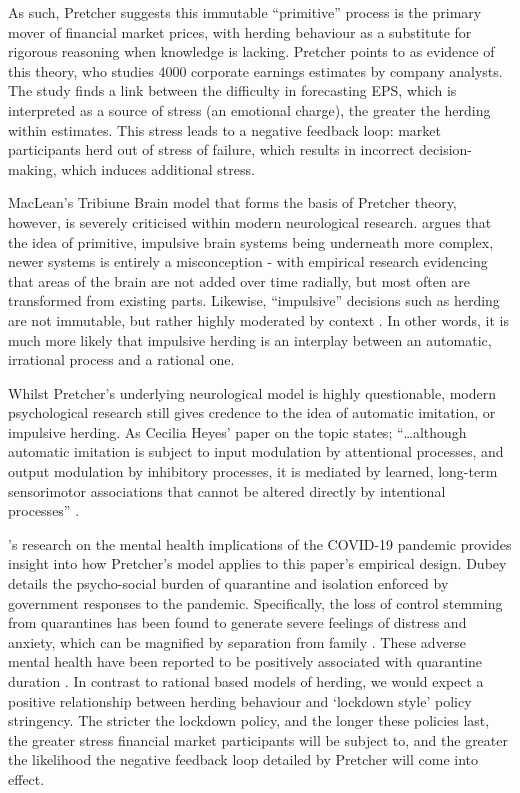 \documentclass[12pt]{article}
\numberwithin{table}{section}   %
\begin{document}
As such, Pretcher suggests this immutable “primitive” process is the primary mover of financial market prices, with herding behaviour as a substitute for rigorous reasoning when knowledge is lacking. Pretcher points to \citet{olsen} as evidence of this theory, who studies 4000 corporate earnings estimates by company analysts. The study finds a link between the difficulty in forecasting EPS, which is interpreted as a source of stress (an emotional charge), the greater the herding within estimates. This stress leads to a negative feedback loop: market participants herd out of stress of failure, which results in incorrect decision-making, which induces additional stress.

MacLean’s Tribiune Brain model that forms the basis of Pretcher theory, however, is severely criticised within modern neurological research. \citet{cesario} argues that the idea of primitive, impulsive brain systems being underneath more complex, newer systems is entirely a misconception - with empirical research evidencing that areas of the brain are not added over time radially, but most often are transformed from existing parts. Likewise, “impulsive” decisions such as herding are not immutable, but rather highly moderated by context \citep{kidd, gawronski}. In other words, it is much more likely that impulsive herding is an interplay between an automatic, irrational process and a rational one.

Whilst Pretcher’s underlying neurological model is highly questionable, modern psychological research still gives credence to the idea of automatic imitation, or impulsive herding. As Cecilia Heyes’ paper on the topic states; “…although automatic imitation is subject to input modulation by attentional processes, and output modulation by inhibitory processes, it is mediated by learned, long-term sensorimotor associations that cannot be altered directly by intentional processes” \citep{heyes}.

\citet{dubey}’s research on the mental health implications of the COVID-19 pandemic provides insight into how Pretcher's model applies to this paper’s empirical design. Dubey details the psycho-social burden of quarantine and isolation enforced by government responses to the pandemic. Specifically, the loss of control stemming from quarantines has been found to generate severe feelings of distress and anxiety, which can be magnified by separation from family \citep{brooks}. These adverse mental health have been reported to be positively associated with quarantine duration \citep{hawryluck}. In contrast to rational based models of herding, we would expect a positive relationship between herding behaviour and ‘lockdown style’ policy stringency. The stricter the lockdown policy, and the longer these policies last, the greater stress financial market participants will be subject to, and the greater the likelihood the negative feedback loop detailed by Pretcher will come into effect.
\end{document}
